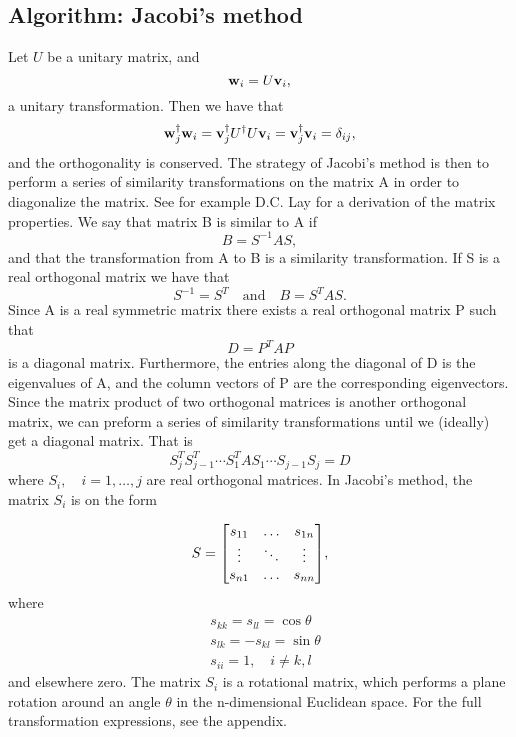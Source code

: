 \subsection{Algorithm: Jacobi's method}
\label{sec:jacobi}
Let $U$ be a unitary matrix, and
  \[\vb{w}_i = U\vb{v}_i,
  \]
a unitary transformation. Then we have that
  \[\vb{w}_j^\dagger \vb{w}_i = \vb{v}_j^\dagger U^\dagger U \vb{v}_i = \vb{v}_j^\dagger \vb{v}_i = \delta_{ij},\]
and the orthogonality is conserved.
The strategy of Jacobi's method is then to perform a series of similarity transformations on the matrix A in order to diagonalize the matrix. See for example  D.C. Lay \cite{linalg} for a derivation of the matrix properties. We say that matrix B is similar to A if
 \begin{equation}
	B = S^{-1}AS,
 \end{equation}
and that the transformation from A to B is a similarity transformation. If S is a real orthogonal matrix we have that
 \begin{equation}\label{eq:sim}
	 S^{-1}=S^T \quad \text{and} \quad B = S^TAS.
 \end{equation}
Since A is a real symmetric matrix there exists a real orthogonal matrix P such that
 \begin{equation}
     D=P^TAP
 \end{equation}
is a diagonal matrix. Furthermore, the entries along the diagonal of D is the eigenvalues of A, and the column vectors of P are the corresponding eigenvectors. Since the matrix product of two orthogonal matrices is another orthogonal matrix, we can preform a series of similarity transformations until we (ideally) get a diagonal matrix. That is
\begin{equation}
S_j^TS_{j-1}^T\cdots S_1^TAS_1 \cdots S_{j-1}S_j = D
\end{equation}
where $S_i, \quad i = 1, \ldots, j $ are real orthogonal matrices. In Jacobi's method, the matrix $S_i$ is on the form

\begin{equation}\label{eq:S}
S =
\mqty[s_{11} & \hdots & s_{1n} \\
\vdots & \ddots & \vdots \\
s_{n1} & \hdots & s_{nn} ],
\end{equation}
where
\begin{equation}
\begin{split}
&s_{kk}=s_{ll} = \cos \theta \\
&s_{lk} = -s_{kl} = \sin \theta \\
&s_{ii} =  1, \quad i \neq k,l
\end{split}
\end{equation}
and elsewhere zero. The matrix $S_i$ is a rotational matrix, which performs a plane rotation around an angle $\theta$ in the n-dimensional Euclidean space. For the full transformation expressions, see the appendix.

